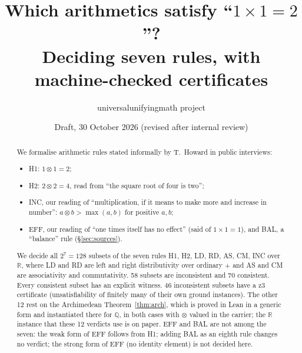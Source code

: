 \documentclass[11pt]{article}
\title{Which arithmetics satisfy ``$1\times1=2$''?\\ Deciding seven rules, with machine-checked certificates}
\author{universalunifyingmath project}
\date{Draft, 30 October 2026 (revised after internal review)}
\theoremstyle{remark}
\begin{document}
\maketitle

\begin{abstract}
We formalise arithmetic rules stated informally by T.~Howard in public interviews:
\begin{itemize}
\item H1: $1\otimes1=2$;
\item H2: $2\otimes2=4$, read from ``the square root of four is two'';
\item INC, our reading of ``multiplication, if it means to make more and increase in number'': $a\otimes b>\max(a,b)$ for positive $a,b$;
\item EFF, our reading of ``one times itself has no effect'' (said of $1\times1=1$), and BAL, a ``balance'' rule (\S\ref{sec:sources}).
\end{itemize}
We decide all $2^7=128$ subsets of the seven rules H1, H2, LD, RD, AS, CM, INC over $\mathbb R$, where LD and RD are left and right distributivity over ordinary $+$ and AS and CM are associativity and commutativity. 58 subsets are inconsistent and 70 consistent. Every consistent subset has an explicit witness. 46 inconsistent subsets have a z3 certificate (unsatisfiability of finitely many of their own ground instances). The other 12 rest on the Archimedean Theorem~\ref{thm:arch}, which is proved in Lean in a generic form and instantiated there for $\mathbb Q$, in both cases with $\otimes$ valued in the carrier; the $\mathbb R$ instance that these 12 verdicts use is on paper. EFF and BAL are not among the seven: the weak form of EFF follows from H1; adding BAL as an eighth rule changes no verdict; the strong form of EFF (no identity element) is not decided here.


\end{abstract}
\end{document}
